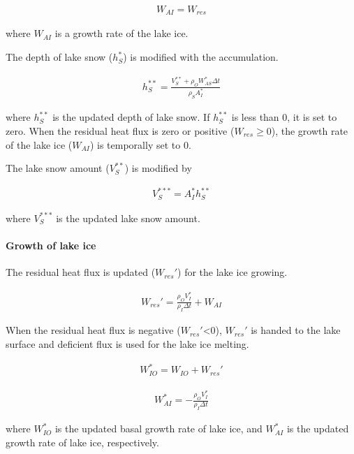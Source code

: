 \begin{eqnarray}
    W_{AI} = W_{res}
\end{eqnarray}

where \(W_{AI}\) is a growth rate of the lake ice.

The depth of lake snow (\(h_S^{\ast}\)) is modified with the accumulation.

\begin{eqnarray}
  h_S^{\ast\ast} = \frac{V_S^{\ast\ast}+ \rho_O W_{AS}^\ast \Delta t}{\rho_S {A_I^\ast}}
\end{eqnarray}

where \(h_S^{\ast\ast}\) is the updated depth of lake snow. If \(h_S^{\ast\ast}\) is less than 0, it is set to zero. When the residual heat flux is zero or positive (\(W_{res}\ge 0\)), the growth rate
of the lake ice (\(W_{AI}\)) is temporally set to 0.

The lake snow amount (\(V_S^{\ast\ast}\)) is modified by

\begin{eqnarray}
    V_S^{\ast\ast\ast} = A_I^\ast h_S^{\ast\ast}
\end{eqnarray}

where \(V_S^{\ast\ast\ast}\) is the updated lake snow amount.

\paragraph{Growth of lake ice}\label{growth-of-lake-ice}

The residual heat flux is updated (\(W_{res}'\)) for the lake ice growing.

\begin{eqnarray}
    W_{res}' = \frac{\rho_OV_I^\ast}{\rho_I \Delta t}+ W_{AI}
\end{eqnarray}

When the residual heat flux is negative (\(W_{res}'\)\textless0), \(W_{res}'\) is handed to the lake surface and deficient flux is used for the lake ice melting.

\begin{eqnarray}
        W_{IO}^\ast = W_{IO} + W_{res}'
\end{eqnarray}

\begin{eqnarray}
    W_{AI}^\ast = - \frac{\rho_OV_I^{\ast}}{\rho_I \Delta t}
\end{eqnarray}

where \(W_{IO}^\ast\) is the updated basal growth rate of lake ice, and \(W_{AI}^\ast\) is the updated growth rate of lake ice, respectively.

